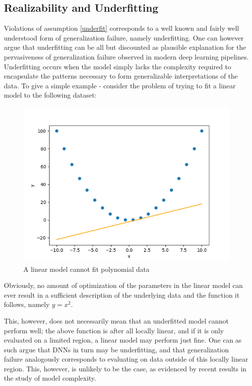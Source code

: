 	\subsection{Realizability and Underfitting}
		Violations of assumption \ref{underfit} corresponds to a well known and fairly well understood form of generalization failure, namely underfitting. One can however argue that underfitting can be all but discounted as plausible explanation for the pervasiveness of generalization failure observed in modern deep learning pipelines. Underfitting occurs when the model simply lacks the complexity required to encapsulate the patterns necessary to form generalizable interpretations of the data. To give a simple example - consider the problem of trying to fit a linear model to the following dataset: 
		\begin{figure}[ht]
			\includegraphics[width=\linewidth]{illustrations/regression_example.png}
			\caption{A linear model cannot fit polynomial data}
			\label{underfit example}
		\end{figure}
		Obviously, no amount of optimization of the parameters in the linear model can ever result in a sufficient description of the underlying data and the function it follows, namely \(y=x^2\). 
		
		This, however, does not necessarily mean that an underfitted model cannot perform well; the above function is after all locally linear, and if it is only evaluated on a limited region, a linear model may perform just fine. One can as such argue that DNNs in turn may be underfitting, and that generalization failure analogously corresponds to evaluating on data outside of this locally linear region. This, however, is unlikely to be the case, as evidenced by recent results in the study of model complexity.
		
